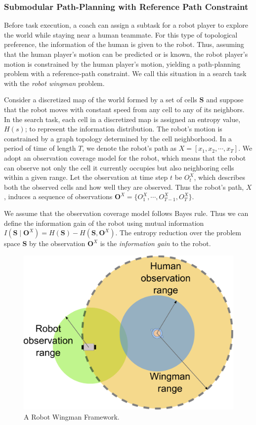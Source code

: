 \documentclass[phd]{byuprop}
\begin{document}
\subsubsection{Submodular Path-Planning with Reference Path Constraint}
\label{sec:project_description:submodular_path_planning_with_reference_path_constraint}

Before task execution, a coach can assign a subtask for a robot player to explore the world while staying near a human teammate.
For this type of topological preference, the information of the human is given to the robot.
Thus, assuming that the human player's motion can be predicted or is known, the robot player's motion is constrained by the human player's motion, yielding a path-planning problem with a reference-path constraint.
We call this situation in a search task with the {\em robot wingman} problem.

Consider a discretized map of the world formed by a set of cells $ \mathbf{S}$ and suppose that the robot moves with constant speed from any cell to any of its neighbors.
In the search task, each cell in a discretized map is assigned an entropy value, $ H(s) $; to represent the information distribution.
The robot's motion is constrained by a graph topology determined by the cell neighborhood. 
In a period of time of length $ T $, we denote the robot's path as $ X = [x_{1}, x_{2} , \cdots , x_{T}] $.
We adopt an observation coverage model for the robot, which means that the robot can observe not only the cell it currently occupies but also neighboring cells within a given range.
Let the observation at time step $ t $ be $ O^{X}_{t} $, which describes both the observed cells and how well they are observed.
Thus the robot's path, $X$, induces a sequence of observations $ \mathbf{O}^{X} = \{ O^{X}_{1}, \cdots , O^{X}_{T-1}, O^{X}_{T} \}$.

We assume that the observation coverage model follows Bayes rule.
Thus we can define the information gain of the robot using mutual information $ I( \mathbf{S} \mid \mathbf{O}^{X} ) =  H( \mathbf{S} ) - H( \mathbf{S}, \mathbf{O}^{X}  ) $.
The entropy reduction over the problem space $ \mathbf{S} $ by the observation $ \mathbf{O}^{X} $ is the {\em information gain} to the robot.

\begin{figure}[hbtp]
\centering
\includegraphics[width=0.37\linewidth]{./fig/Wingman.pdf}
\caption{A Robot Wingman Framework.}
\label{fig:Wingman}
\end{figure}
\end{document}
